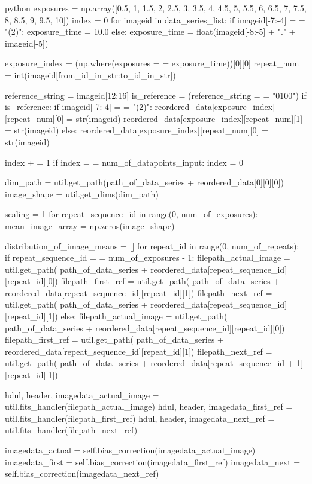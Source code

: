 \documentclass[../main.tex]{subfiles}
\begin{document}
\begin{mintedbox}{python}
exposures  =  np.array([0.5, 1, 1.5, 2, 2.5, 3, 3.5, 4, 4.5, 5, 5.5, 6, 6.5, 7, 7.5, 8, 8.5, 9, 9.5, 10])
index  =  0
for imageid in data_series_list:
if imageid[-7:-4]  =  =  "(2)":
exposure_time  =  10.0
else:
exposure_time  =  float(imageid[-8:-5] + "." + imageid[-5])

exposure_index  =  (np.where(exposures  =  =  exposure_time))[0][0]
repeat_num  =  int(imageid[from_id_in_str:to_id_in_str])

reference_string  =  imageid[12:16]
is_reference  =  (reference_string  =  =  "0100")
if is_reference:
if imageid[-7:-4]  =  =  "(2)":
reordered_data[exposure_index][repeat_num][0]  =  str(imageid)
reordered_data[exposure_index][repeat_num][1]  =  str(imageid)
else:
reordered_data[exposure_index][repeat_num][0]  =  str(imageid)

index + =  1
if index  =  =  num_of_datapoints_input:
index  =  0

dim_path  =  util.get_path(path_of_data_series + reordered_data[0][0][0])
image_shape  =  util.get_dims(dim_path)

scaling  =  1
for repeat_sequence_id in range(0, num_of_exposures):
mean_image_array  =  np.zeros(image_shape)

distribution_of_image_means  =  []
for repeat_id in range(0, num_of_repeats):
if repeat_sequence_id  =  =  num_of_exposures - 1:
filepath_actual_image  =  util.get_path(
path_of_data_series + reordered_data[repeat_sequence_id][repeat_id][0])
filepath_first_ref  =  util.get_path(
path_of_data_series + reordered_data[repeat_sequence_id][repeat_id][1])
filepath_next_ref  =  util.get_path(
path_of_data_series + reordered_data[repeat_sequence_id][repeat_id][1])
else:
filepath_actual_image  =  util.get_path(
path_of_data_series + reordered_data[repeat_sequence_id][repeat_id][0])
filepath_first_ref  =  util.get_path(
path_of_data_series + reordered_data[repeat_sequence_id][repeat_id][1])
filepath_next_ref  =  util.get_path(
path_of_data_series + reordered_data[repeat_sequence_id + 1][repeat_id][1])

hdul, header, imagedata_actual_image  =  util.fits_handler(filepath_actual_image)
hdul, header, imagedata_first_ref  =  util.fits_handler(filepath_first_ref)
hdul, header, imagedata_next_ref  =  util.fits_handler(filepath_next_ref)

imagedata_actual  =  self.bias_correction(imagedata_actual_image)
imagedata_first  =  self.bias_correction(imagedata_first_ref)
imagedata_next  =  self.bias_correction(imagedata_next_ref)


\end{mintedbox}
\end{document}
